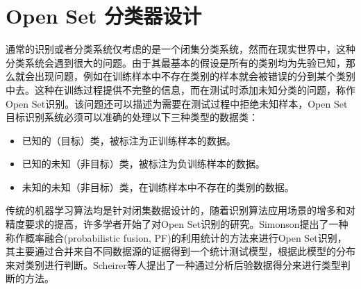 \section{Open Set 分类器设计}
\label{sec:sei_method}
通常的识别或者分类系统仅考虑的是一个闭集分类系统，然而在现实世界中，这种分类系统会遇到很大的问题。由于其最基本的假设是所有的类别均为先验已知，那么就会出现问题，例如在训练样本中不存在类别的样本就会被错误的分到某个类别中去。这种在训练过程提供不完整的信息，而在测试时添加未知分类的问题，称作Open Set识别。该问题还可以描述为需要在测试过程中拒绝未知样本，Open Set目标识别系统必须可以准确的处理以下三种类型的数据类：
\begin{itemize}
	\item 已知的（目标）类，被标注为正训练样本的数据。
	\item 已知的未知（非目标）类，被标注为负训练样本的数据。
	\item 未知的未知（非目标）类，在训练样本中不存在的类别的数据。
\end{itemize}
传统的机器学习算法均是针对闭集数据设计的，随着识别算法应用场景的增多和对精度要求的提高，许多学者开始了对Open Set识别的研究。Simonson提出了一种称作概率融合(probabilistic fusion, PF)的利用统计的方法来进行Open Set识别，其主要通过合并来自不同数据源的证据得到一个统计测试模型，根据此模型的分布来对类别进行判断。Scheirer等人提出了一种通过分析后验数据得分来进行类型判断的方法。

